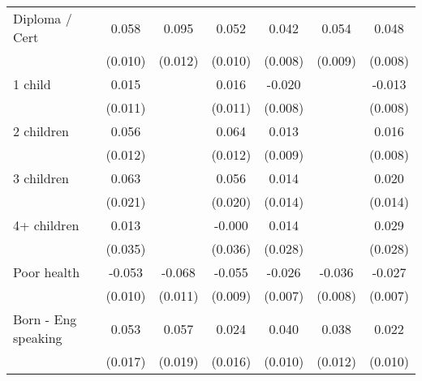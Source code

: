 {\begin{tabular}{l*{6}{c}}
Diploma / Cert      &       0.058\sym{***}&       0.095\sym{***}&       0.052\sym{***}&       0.042\sym{***}&       0.054\sym{***}&       0.048\sym{***}\\
                    &     (0.010)         &     (0.012)         &     (0.010)         &     (0.008)         &     (0.009)         &     (0.008)         \\
1 child             &       0.015         &                     &       0.016         &      -0.020\sym{***}&                     &      -0.013         \\
                    &     (0.011)         &                     &     (0.011)         &     (0.008)         &                     &     (0.008)         \\
2 children          &       0.056\sym{***}&                     &       0.064\sym{***}&       0.013         &                     &       0.016\sym{*}  \\
                    &     (0.012)         &                     &     (0.012)         &     (0.009)         &                     &     (0.008)         \\
3 children          &       0.063\sym{***}&                     &       0.056\sym{***}&       0.014         &                     &       0.020         \\
                    &     (0.021)         &                     &     (0.020)         &     (0.014)         &                     &     (0.014)         \\
4+ children         &       0.013         &                     &      -0.000         &       0.014         &                     &       0.029         \\
                    &     (0.035)         &                     &     (0.036)         &     (0.028)         &                     &     (0.028)         \\
Poor health         &      -0.053\sym{***}&      -0.068\sym{***}&      -0.055\sym{***}&      -0.026\sym{***}&      -0.036\sym{***}&      -0.027\sym{***}\\
                    &     (0.010)         &     (0.011)         &     (0.009)         &     (0.007)         &     (0.008)         &     (0.007)         \\
Born - Eng speaking &       0.053\sym{***}&       0.057\sym{***}&       0.024         &       0.040\sym{***}&       0.038\sym{***}&       0.022\sym{**} \\
                    &     (0.017)         &     (0.019)         &     (0.016)         &     (0.010)         &     (0.012)         &     (0.010)         \\

\end{tabular}}

